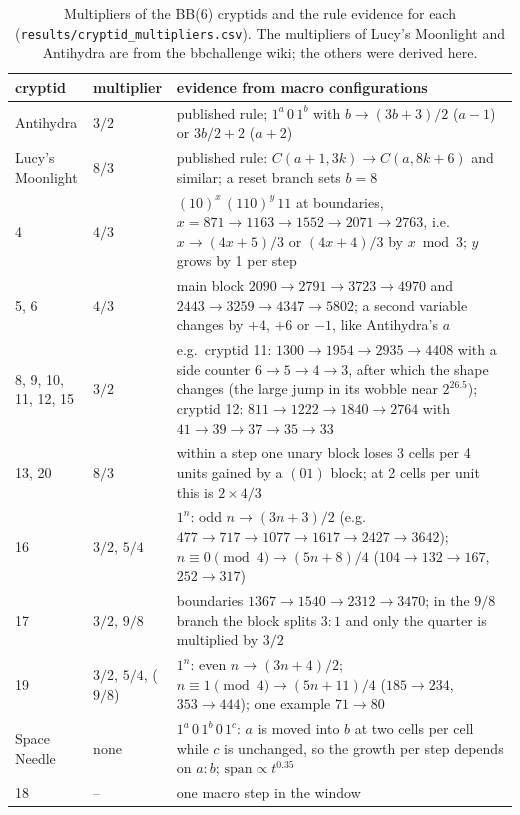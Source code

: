 \documentclass[11pt,a4paper]{article}
\newcommand{\BB}[1]{BB(#1)}
\begin{document}
\begin{table}[t]
\centering\small
\begin{tabular}{@{}p{2.6cm}p{2.2cm}p{9.4cm}@{}}
\toprule
cryptid & multiplier & evidence from macro configurations \\
\midrule
Antihydra & $3/2$ & published rule; $1^a\,0\,1^b$ with $b \to (3b+3)/2$ ($a-1$) or $3b/2+2$ ($a+2$)\\
Lucy's Moonlight & $8/3$ & published rule: $C(a{+}1, 3k) \to C(a, 8k{+}6)$ and similar; a reset branch sets $b = 8$\\
4 & $4/3$ & $(10)^x\,(110)^y\,11$ at boundaries, $x = 871 \to 1163 \to 1552 \to 2071 \to 2763$, i.e.\ $x \to (4x{+}5)/3$ or $(4x{+}4)/3$ by $x \bmod 3$; $y$ grows by 1 per step\\
5, 6 & $4/3$ & main block $2090 \to 2791 \to 3723 \to 4970$ and $2443 \to 3259 \to 4347 \to 5802$; a second variable changes by $+4$, $+6$ or $-1$, like Antihydra's $a$\\
8, 9, 10, 11, 12, 15 & $3/2$ & e.g.\ cryptid 11: $1300 \to 1954 \to 2935 \to 4408$ with a side counter $6 \to 5 \to 4 \to 3$, after which the shape changes (the large jump in its wobble near $2^{26.5}$); cryptid 12: $811 \to 1222 \to 1840 \to 2764$ with $41 \to 39 \to 37 \to 35 \to 33$\\
13, 20 & $8/3$ & within a step one unary block loses 3 cells per 4 units gained by a $(01)$ block; at 2 cells per unit this is $2 \times 4/3$\\
16 & $3/2$, $5/4$ & $1^n$: odd $n \to (3n+3)/2$ (e.g.\ $477 \to 717 \to 1077 \to 1617 \to 2427 \to 3642$); $n \equiv 0 \pmod 4 \to (5n+8)/4$ ($104 \to 132 \to 167$, $252 \to 317$)\\
17 & $3/2$, $9/8$ & boundaries $1367 \to 1540 \to 2312 \to 3470$; in the $9/8$ branch the block splits $3{:}1$ and only the quarter is multiplied by $3/2$\\
19 & $3/2$, $5/4$, ($9/8$) & $1^n$: even $n \to (3n+4)/2$; $n \equiv 1 \pmod 4 \to (5n+11)/4$ ($185 \to 234$, $353 \to 444$); one example $71 \to 80$\\
Space Needle & none & $1^a\,0\,1^b\,0\,1^c$: $a$ is moved into $b$ at two cells per cell while $c$ is unchanged, so the growth per step depends on $a{:}b$; $\mathrm{span}\propto t^{0.35}$\\
18 & -- & one macro step in the window\\
\bottomrule
\end{tabular}
\caption{Multipliers of the \BB{6} cryptids and the rule evidence for each
(\texttt{results/cryptid\_multipliers.csv}). The multipliers of Lucy's Moonlight and Antihydra are
from the bbchallenge wiki; the others were derived here.}
\label{tab:cryptidrules}
\end{table}
\end{document}
